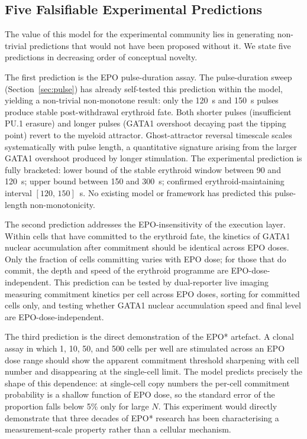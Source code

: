 \subsection{Five Falsifiable Experimental Predictions}

The value of this model for the experimental community lies in generating
non-trivial predictions that would not have been proposed without it. We state
five predictions in decreasing order of conceptual novelty.

The first prediction is the EPO pulse-duration assay. The pulse-duration sweep
(Section~\ref{sec:pulse}) has already self-tested this prediction within the
model, yielding a non-trivial non-monotone result: only the 120~s and 150~s
pulses produce stable post-withdrawal erythroid fate. Both shorter pulses
(insufficient PU.1 erasure) and longer pulses (GATA1 overshoot decaying past the
tipping point) revert to the myeloid attractor. Ghost-attractor reversal
timescale scales systematically with pulse length, a quantitative signature
arising from the larger GATA1 overshoot produced by longer stimulation. The
experimental prediction is fully bracketed: lower bound of the stable erythroid
window between 90 and 120~s; upper bound between 150 and 300~s; confirmed
erythroid-maintaining interval $[120,\,150]$~s. No existing model or framework
has predicted this pulse-length non-monotonicity.

The second prediction addresses the EPO-insensitivity of the execution layer.
Within cells that have committed to the erythroid fate, the kinetics of GATA1
nuclear accumulation after commitment should be identical across EPO doses. Only
the fraction of cells committing varies with EPO dose; for those that do commit,
the depth and speed of the erythroid programme are EPO-dose-independent. This
prediction can be tested by dual-reporter live imaging measuring commitment
kinetics per cell across EPO doses, sorting for committed cells only, and testing
whether GATA1 nuclear accumulation speed and final level are EPO-dose-independent.

The third prediction is the direct demonstration of the EPO* artefact. A clonal
assay in which 1, 10, 50, and 500 cells per well are stimulated across an EPO
dose range should show the apparent commitment threshold sharpening with cell
number and disappearing at the single-cell limit. The model predicts precisely
the shape of this dependence: at single-cell copy numbers the per-cell commitment
probability is a shallow function of EPO dose, so the standard error of the
proportion falls below 5\% only for large $N$. This experiment would directly
demonstrate that three decades of EPO* research has been characterising a
measurement-scale property rather than a cellular mechanism.

